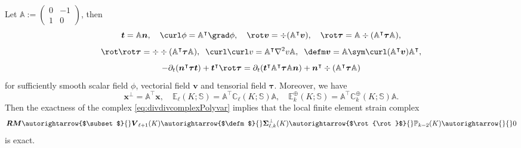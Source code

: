 Let
$
\mathbb A:=\begin{pmatrix}
0 & -1\\
1 & 0
\end{pmatrix}
$, then
\[
\boldsymbol  t=\mathbb A \boldsymbol  n,\quad \curl\phi=\mathbb A^{\intercal}\grad\phi,\quad \rot\boldsymbol  v=\div(\mathbb A^{\intercal} \boldsymbol  v), \quad \rot\boldsymbol \tau=\mathbb A\div(\mathbb A^{\intercal}\boldsymbol \tau\mathbb A),
\]
\[
 \rot\rot\boldsymbol \tau=\div\div(\mathbb A^{\intercal}\boldsymbol \tau\mathbb A),\;\; \curl\curl v=\mathbb A^{\intercal}\nabla^2v\mathbb A,\;\; \defm\boldsymbol  v=\mathbb A\sym\curl(\mathbb A^{\intercal}\boldsymbol  v)\mathbb A^{\intercal},
\]
\[
-\partial_{t}(\boldsymbol  n^{\intercal}\boldsymbol \tau\boldsymbol  t)+\boldsymbol  t^{\intercal}\rot\boldsymbol \tau=\partial_{t}(\boldsymbol  t^{\intercal}\mathbb A^{\intercal}\boldsymbol \tau\mathbb A\boldsymbol  n)+\boldsymbol  n^{\intercal}\div(\mathbb A^{\intercal}\boldsymbol \tau\mathbb A)
\]
for sufficiently smooth scalar field $\phi$, vectorial field $\boldsymbol  v$ and tensorial field $\boldsymbol \tau$. Moreover, we have
\[
\boldsymbol  x^{\perp}=\mathbb A^{\intercal} \boldsymbol  x,\quad \mathbb E_{\ell}(K;\mathbb S)=\mathbb A^{\intercal}\mathbb C_{\ell}(K;\mathbb S)\mathbb A,\quad \mathbb E_k^{\oplus}(K;\mathbb S)=\mathbb A^{\intercal}\mathbb C_k^{\oplus}(K;\mathbb S)\mathbb A.
\]
Then the exactness of the complex \eqref{eq:divdivcomplexPolyvar} implies that the local finite element strain complex
\begin{equation}\label{eq:rotrotcomplexPolyvar}
\boldsymbol  {RM}\autorightarrow{$\subset$}{} \boldsymbol V_{\ell+1}(K)\autorightarrow{$\defm$}{} \boldsymbol \Sigma_{\ell,k}^{\perp}(K) \autorightarrow{$\rot{\rot}$}{} \mathbb P_{k-2}(K)\autorightarrow{}{}0
\end{equation}
is exact.


